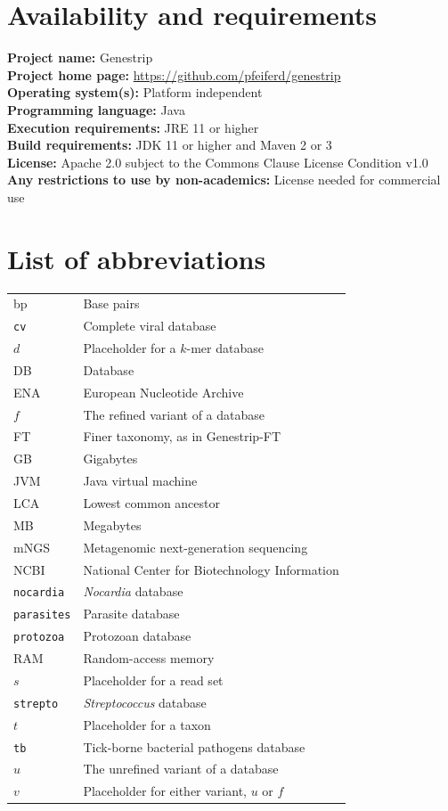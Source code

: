 \documentclass[pdflatex,sn-vancouver-num]{sn-jnl}
\begin{document}
    \section{Availability and requirements}

\textbf{Project name:} Genestrip\\
\textbf{Project home page:} \url{https://github.com/pfeiferd/genestrip}\\
\textbf{Operating system(s):} Platform independent\\
\textbf{Programming language:} Java\\
\textbf{Execution requirements:} JRE 11 or higher \\
\textbf{Build requirements:} JDK 11 or higher and Maven 2 or 3\\
\textbf{License:} Apache 2.0 subject to the Commons Clause License Condition v1.0 \\
\textbf{Any restrictions to use by non-academics:} License needed for commercial use\\

\section{List of abbreviations}

\begin{tabular}{lp{10cm}}
bp & Base pairs \\
\texttt{cv} & Complete viral database \\
$d$ & Placeholder for a $k$-mer database \\
DB & Database \\
ENA & European Nucleotide Archive \\
$f$ & The refined variant of a database \\
FT & Finer taxonomy, as in Genestrip-FT \\
GB & Gigabytes \\
JVM & Java virtual machine \\
LCA & Lowest common ancestor \\
MB & Megabytes \\
mNGS & Metagenomic next-generation sequencing \\
NCBI & National Center for Biotechnology Information \\
\texttt{nocardia} & \emph{Nocardia} database \\
\texttt{parasites} & Parasite database \\
\texttt{protozoa} & Protozoan database \\
RAM & Random-access memory \\
$s$ & Placeholder for a read set \\
\texttt{strepto} & \emph{Streptococcus} database \\
$t$ & Placeholder for a taxon \\
\texttt{tb} & Tick-borne bacterial pathogens database \\
$u$ & The unrefined variant of a database \\
$v$ & Placeholder for either variant, $u$ or $f$
\end{tabular}
\end{document}
